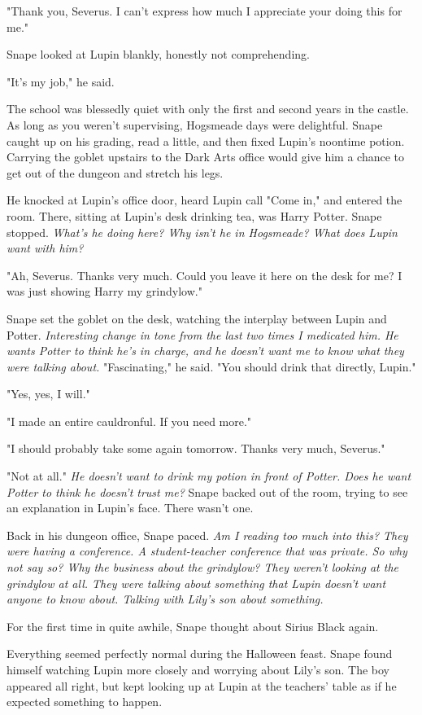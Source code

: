 "Thank you, Severus. I can't express how much I appreciate your doing this for me."

Snape looked at Lupin blankly, honestly not comprehending.

"It's my job," he said.

The school was blessedly quiet with only the first and second years in the castle. As long as you weren't supervising, Hogsmeade days were delightful. Snape caught up on his grading, read a little, and then fixed Lupin's noontime potion. Carrying the goblet upstairs to the Dark Arts office would give him a chance to get out of the dungeon and stretch his legs.

He knocked at Lupin's office door, heard Lupin call "Come in," and entered the room. There, sitting at Lupin's desk drinking tea, was Harry Potter. Snape stopped. \emph{What's he doing here? Why isn't he in Hogsmeade? What does Lupin want with him?}

"Ah, Severus. Thanks very much. Could you leave it here on the desk for me? I was just showing Harry my grindylow."

Snape set the goblet on the desk, watching the interplay between Lupin and Potter. \emph{Interesting change in tone from the last two times I medicated him. He wants Potter to think he's in charge, and he doesn't want me to know what they were talking about.} "Fascinating," he said. "You should drink that directly, Lupin."

"Yes, yes, I will."

"I made an entire cauldronful. If you need more."

"I should probably take some again tomorrow. Thanks very much, Severus."

"Not at all." \emph{He doesn't want to drink my potion in front of Potter. Does he want Potter to think he doesn't trust me?} Snape backed out of the room, trying to see an explanation in Lupin's face. There wasn't one.

Back in his dungeon office, Snape paced. \emph{Am I reading too much into this? They were having a conference. A student-teacher conference that was private. So why not say so? Why the business about the grindylow? They weren't looking at the grindylow at all. They were talking about something that Lupin doesn't want anyone to know about. Talking with Lily's son about something.}

For the first time in quite awhile, Snape thought about Sirius Black again.

Everything seemed perfectly normal during the Halloween feast. Snape found himself watching Lupin more closely and worrying about Lily's son. The boy appeared all right, but kept looking up at Lupin at the teachers' table as if he expected something to happen.

